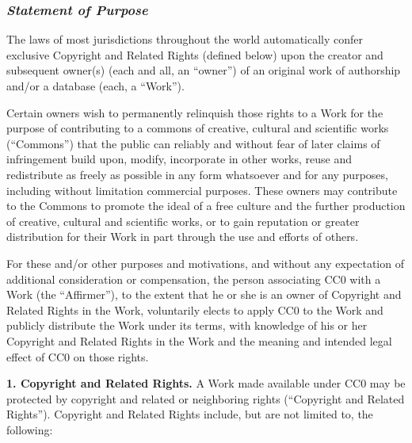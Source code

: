 \subsubsection{\emph{Statement of Purpose}}
\par The laws of most jurisdictions throughout the world
automatically confer exclusive Copyright and Related Rights
(defined below) upon the creator and subsequent owner(s) (each
and all, an ``owner'') of an original work of authorship and/or
a database (each, a ``Work'').
\par Certain owners wish to permanently relinquish those rights
to a Work for the purpose of contributing to a commons of
creative, cultural and scientific works (``Commons'') that the
public can reliably and without fear of later claims of
infringement build upon, modify, incorporate in other works,
reuse and redistribute as freely as possible in any form
whatsoever and for any purposes, including without limitation
commercial purposes. These owners may contribute to the
Commons to promote the ideal of a free culture and the further
production of creative, cultural and scientific works, or to
gain reputation or greater distribution for their Work in part
through the use and efforts of others.
\par For these and/or other purposes and motivations, and
without any expectation of additional consideration or
compensation, the person associating CC0 with a Work (the
``Affirmer''), to the extent that he or she is an owner of
Copyright and Related Rights in the Work, voluntarily elects
to apply CC0 to the Work and publicly distribute the Work
under its terms, with knowledge of his or her Copyright and
Related Rights in the Work and the meaning and intended legal
effect of CC0 on those rights.
\par \textbf{1. Copyright and Related Rights.}
A Work made available under CC0 may be protected by
copyright and related or neighboring rights (``Copyright and
Related Rights''). Copyright and Related Rights include, but
are not limited to, the following:

